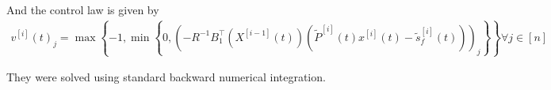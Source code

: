 \documentclass[processes,article,submit,moreauthors,pdftex]{Definitions/mdpi}
\begin{document}
And the control law is given by
\begin{align}
v^{[i]}(t)_j = \max \left\{ -1,\min\left\{0,\left( -R^{-1}B_1^\top\left(X^{[i-1]}(t)\right)\left(\tilde{P}^{[i]}(t)x^{[i]}(t)-\tilde{s}_f^{[i]}(t)\right)\right)_j \right\}\right\} \forall j \in [n]
\end{align} 

They were solved using standard backward numerical integration.











\end{document}
